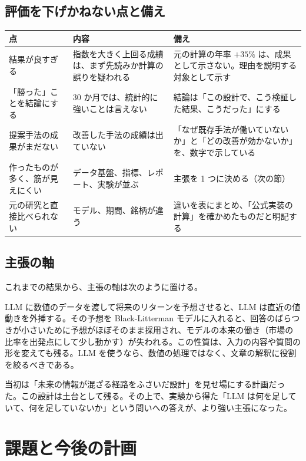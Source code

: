 \documentclass[xelatex,ja=standard,jafont=hiragino-pron,a4paper,10pt]{bxjsreport}
\begin{document}
\section{評価を下げかねない点と備え}

\begin{longtable}{p{4.20cm}p{5.00cm}p{5.20cm}}
\toprule
\textbf{点} & \textbf{内容} & \textbf{備え} \\
\midrule
\endfirsthead
\bottomrule
\endfoot
結果が良すぎる & 指数を大きく上回る成績は、まず先読みか計算の誤りを疑われる & 元の計算の年率 $+35\%$ は、成果として示さない。理由を説明する対象として示す \\
「勝った」ことを結論にする & 30 か月では、統計的に強いことは言えない & 結論は「この設計で、こう検証した結果、こうだった」にする \\
提案手法の成果がまだない & 改善した手法の成績は出ていない & 「なぜ既存手法が働いていないか」と「どの改善が効かないか」を、数字で示している \\
作ったものが多く、筋が見えにくい & データ基盤、指標、レポート、実験が並ぶ & 主張を 1 つに決める（次の節） \\
元の研究と直接比べられない & モデル、期間、銘柄が違う & 違いを表にまとめ、「公式実装の計算」を確かめたものだと明記する \\
\end{longtable}

\section{主張の軸}

これまでの結果から、主張の軸は次のように置ける。

\begin{keybox}[主張]
LLM に数値のデータを渡して将来のリターンを予想させると、LLM は直近の値動きを外挿する。その予想を Black-Litterman モデルに入れると、回答のばらつきが小さいために予想がほぼそのまま採用され、モデルの本来の働き（市場の比率を出発点にして少し動かす）が失われる。この性質は、入力の内容や質問の形を変えても残る。LLM を使うなら、数値の処理ではなく、文章の解釈に役割を絞るべきである。
\end{keybox}

当初は「未来の情報が混ざる経路をふさいだ設計」を見せ場にする計画だった。この設計は土台として残る。その上で、実験から得た「LLM は何を足していて、何を足していないか」という問いへの答えが、より強い主張になった。

\chapter{課題と今後の計画}\label{ch:future}
\end{document}
